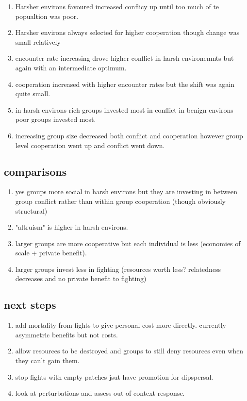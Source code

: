
\begin{enumerate}
    \item Harsher environs favoured increased conflicy up until too much of te popualtion was poor.
    \item Harsher environs always selected for higher cooperation though change was small relatively 
    \item encounter rate increasing drove higher conflict in harsh environemnts but again with an intermediate optimum. 
    \item cooperation increased with higher encounter rates but the shift was again quite small.
    \item in harsh environs rich groups invested most in conflict in benign environs poor groups invested most. 
    \item increasing group size decreased both conflict and cooperation however group level cooperation went up and conflict went down. 
\end{enumerate}

\subsection{comparisons} 
\begin{enumerate}
    \item yes groups more social in harsh environs but they are investing in between group conflict rather than within group cooperation (though obviously structural)
    \item "altruism" is higher in harsh environs.
    \item larger groups are more cooperative but each individual is less (economies of scale + private benefit).
    \item larger groups invest less in fighting (resources worth less? relatedness decreases and no private benefit to fighting)
\end{enumerate}

\subsection{next steps}
\begin{enumerate}
    \item add mortality from fights to give personal cost more directly. currently asymmetric benefits but not costs.
    \item allow resources to be destroyed and groups to still deny resources even when they can't gain them.
    \item stop fights with empty patches jsut have promotion for dipspersal.
    \item look at perturbations and assess out of context response. 
\end{enumerate}